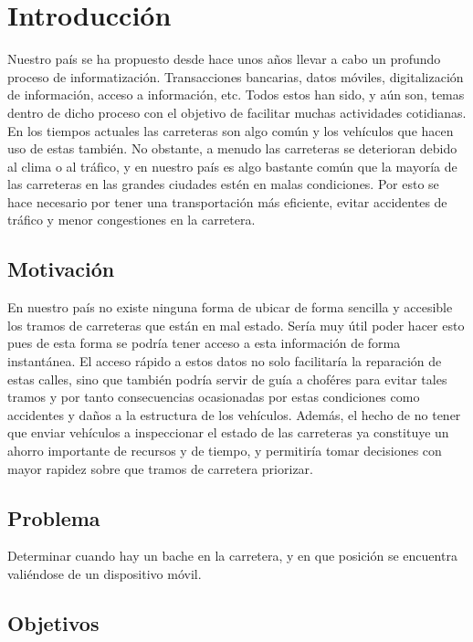 \chapter*{Introducción}\label{chapter:introduction}

Nuestro país se ha propuesto desde hace unos años llevar a cabo un profundo proceso de informatización.
Transacciones bancarias, datos móviles, digitalización de información, acceso a información, etc. Todos
estos han sido, y aún son, temas dentro de dicho proceso con el objetivo de facilitar muchas actividades
cotidianas. En los tiempos actuales las carreteras son algo común y los vehículos que hacen uso de estas
también. No obstante, a menudo las carreteras se deterioran debido al clima o al tráfico, y en nuestro
país es algo bastante común que la mayoría de las carreteras en las grandes ciudades estén en malas condiciones.
Por esto se hace necesario por tener una transportación más eficiente, evitar accidentes de tráfico y menor congestiones
en la carretera.

\section*{Motivación}
En nuestro país no existe ninguna forma de ubicar de forma sencilla y accesible los tramos de carreteras que están
en mal estado. Sería muy útil poder hacer esto pues de esta forma se podría tener acceso a esta información de forma
instantánea. El acceso rápido a estos datos no solo facilitaría la reparación de estas calles, sino que también podría
servir de guía a choféres para evitar tales tramos y por tanto consecuencias ocasionadas por estas condiciones como 
accidentes y daños a la estructura de los vehículos. Además, el hecho de no tener que enviar vehículos a inspeccionar
el estado de las carreteras ya constituye un ahorro importante de recursos y de tiempo, y permitiría tomar decisiones 
con mayor rapidez sobre que tramos de carretera priorizar.

\section*{Problema}
Determinar cuando hay un bache en la carretera, y en que posición se encuentra valiéndose de un dispositivo móvil.


\section*{Objetivos}
